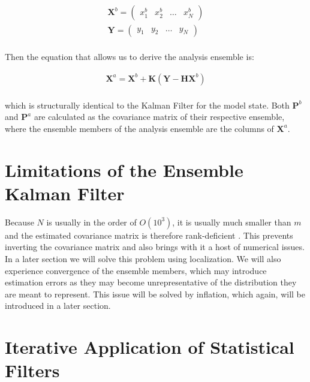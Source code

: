 \documentclass{article}
\begin{document}
\begin{gather*}
\mathbf{X}^b =
\begin{pmatrix}
x_1^b & x_2^b & \dots & x_N^b
\end{pmatrix} \\
\mathbf{Y} =
\begin{pmatrix}
y_1 & y_2 & \dots & y_N
\end{pmatrix} \\
\end{gather*}

Then the equation that allows us to derive the analysis ensemble is:

\begin{align*}
\mathbf{X}^a = \mathbf{X}^b + \mathbf{K} (\mathbf{Y} - \mathbf{H} \mathbf{X}^b) \\
\end{align*}

which is structurally identical to the Kalman Filter for the model state. Both $\mathbf{P}^b$ and $\mathbf{P}^a$ are calculated as the covariance matrix of their respective ensemble, where the ensemble members of the analysis ensemble are the columns of $\mathbf{X}^a$. \\

\section{Limitations of the Ensemble Kalman Filter}

Because $N$ is usually in the order of $O(10^3)$, it is usually much smaller than $m$ and the estimated covariance matrix is therefore rank-deficient \cite{Bannister2017}. This prevents inverting the covariance matrix and also brings with it a host of numerical issues. In a later section we will solve this problem using localization. We will also experience convergence of the ensemble members, which may introduce estimation errors as they may become unrepresentative of the distribution they are meant to represent. This issue will be solved by inflation, which again, will be introduced in a later section. \\

\section{Iterative Application of Statistical Filters}
\end{document}
